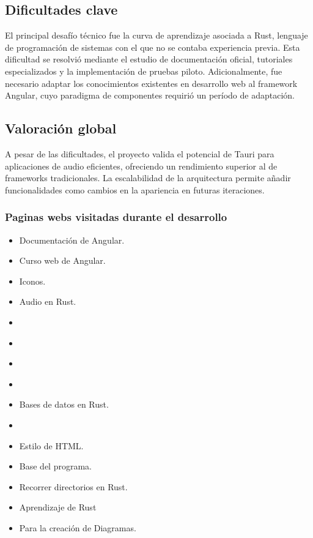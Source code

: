 \documentclass[11pt, a4paper]{article}
\begin{document}
        \subsection{Dificultades clave}

        El principal desafío técnico fue la curva de aprendizaje asociada a Rust, lenguaje de programación de sistemas con el que no se contaba experiencia previa. Esta dificultad se resolvió mediante el estudio de documentación oficial, tutoriales especializados y la implementación de pruebas piloto. Adicionalmente, fue necesario adaptar los conocimientos existentes en desarrollo web al framework Angular, cuyo paradigma de componentes requirió un período de adaptación.

        \subsection{Valoración global}

        A pesar de las dificultades, el proyecto valida el potencial de Tauri para aplicaciones de audio eficientes, ofreciendo un rendimiento superior al de frameworks tradicionales. La escalabilidad de la arquitectura permite añadir funcionalidades como cambios en la apariencia en futuras iteraciones.

          \subsubsection{Paginas webs visitadas durante el desarrollo}

          \begin{itemize}
            \item \textcite{angular2025} Documentación de Angular.
            \item \textcite{cursoangular2025} Curso web de Angular.
            \item \textcite{fontawesome} Iconos.
            \item \textcite{lofty} Audio en Rust.
            \item \textcite{mdnarraybuffer}
            \item \textcite{mdnblob}
            \item \textcite{mdncanvas}
            \item \textcite{mdnpadStart}
            \item \textcite{rusqlite} Bases de datos en Rust.
            \item \textcite{stackoverflowshuffle}
            \item \textcite{tailwind2025} Estilo de HTML.
            \item \textcite{tauri2024} Base del programa.
            \item \textcite{walkdir} Recorrer directorios en Rust.
            \item \textcite{youtuberust2024} Aprendizaje de Rust
            \item \textcite{mermaid} Para la creación de Diagramas.
          \end{itemize}
\printbibliography
\end{document}
